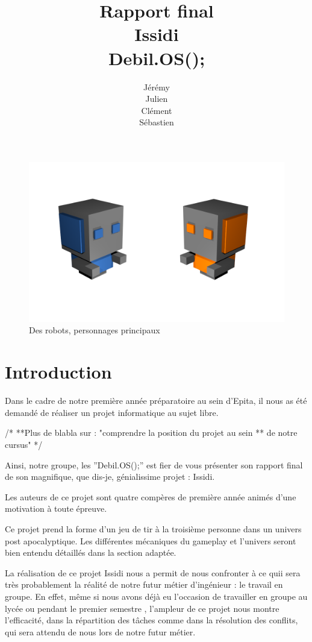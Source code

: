 ﻿\documentclass[12pt]{article}
\title{Rapport final\\
		Issidi\\
		Debil.OS();}
\author{Jérémy \bsc{Beuvry}\\
		Julien \bsc{Boulicaut}\\
		Clément \bsc{Finck}\\
		Sébastien \bsc{Fleury}}
\begin{document}
\maketitle

\begin{figure}[!t]
\centering
\includegraphics[scale=0.4]{front_page.png}
\caption{Des robots, personnages principaux}
\end{figure}

\newpage
\tableofcontents
\newpage
\listoffigures
\newpage

\section{Introduction}
Dans le cadre de notre première année préparatoire au sein d'Epita, 
il nous as été demandé de réaliser un projet informatique au sujet libre.

/*
**Plus de blabla sur : "comprendre la position du projet au sein 
** de notre cursus"
*/

Ainsi, notre groupe, les ''Debil.OS();'' est fier de vous présenter son 
rapport final de son magnifique, que dis-je, génialissime projet :
Issidi.

Les auteurs de ce projet sont quatre compères de première année animés
d'une motivation à toute épreuve.

Ce projet prend la forme d'un jeu de tir à la troisième personne dans
un univers post apocalyptique. Les différentes mécaniques du gameplay et
l'univers seront bien entendu détaillés dans la section adaptée.

La réalisation de ce projet Issidi nous a permit de nous confronter à
ce quii sera très probablement la réalité de notre futur métier
d'ingénieur : le travail en groupe. En effet, même si nous avons déjà eu
l'occasion de travailler en groupe au lycée ou pendant le premier semestre
, l'ampleur de ce projet nous montre l'efficacité, dans la répartition
des tâches comme dans la résolution des conflits, qui sera attendu
de nous lors de notre futur métier.
\end{document}
